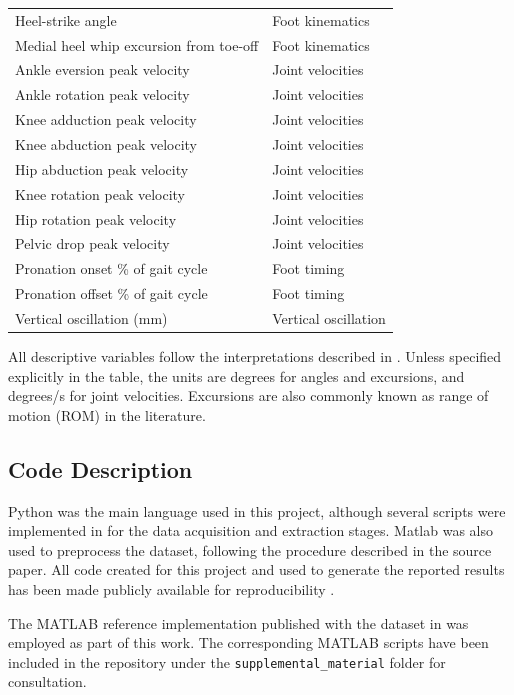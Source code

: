 \begin{table}[ht]
\begin{tabular}{lp{}}
    Heel-strike angle & Foot kinematics \\
    Medial heel whip excursion from toe-off & Foot kinematics \\
    Ankle eversion peak velocity & Joint velocities \\
    Ankle rotation peak velocity & Joint velocities \\
    Knee adduction peak velocity & Joint velocities \\
    Knee abduction peak velocity & Joint velocities \\
    Hip abduction peak velocity & Joint velocities \\
    Knee rotation peak velocity & Joint velocities \\
    Hip rotation peak velocity & Joint velocities \\
    Pelvic drop peak velocity & Joint velocities \\
    Pronation onset \% of gait cycle & Foot timing \\
    Pronation offset \% of gait cycle & Foot timing \\
    Vertical oscillation (mm) & Vertical oscillation \\
    \hline
    \end{tabular}
\end{table}

All descriptive variables follow the interpretations described in \citet{Bartlett2014}. Unless specified explicitly in the table, the units are degrees for angles and excursions, and degrees/s for joint velocities. Excursions are also commonly known as range of motion (ROM) in the literature.

\subsection{Code Description}\label{subsec:method-code-description}
Python was the main language used in this project, although several scripts were implemented in  for the data acquisition and extraction stages. Matlab was also used to preprocess the dataset, following the procedure described in the source paper. All code created for this project and used to generate the reported results has been made publicly available for reproducibility \cite{Zapater_Reig_Running_Injury_Clinic_2025}.

The MATLAB reference implementation published with the dataset in \citet{Ferber2024} was employed as part of this work. The corresponding MATLAB scripts have been included in the repository under the \texttt{supplemental\_material} folder for consultation.


